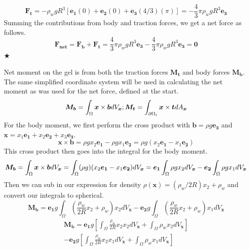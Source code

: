 \documentclass[preprint,12pt,authoryear]{elsarticle}
\begin{document}
\begin{equation}
    \bm{F_t} = -\rho_w g R^3 \left[ \bm{e_1} (0) + \bm{e_2} (0) + \bm{e_3} (4/3)(\pi) \right] = -\frac{4}{3}\pi\rho_w g R^3 \bm{e_3}
\end{equation}
Summing the contributions from body and traction forces, we get a net force as follows.
\begin{equation}
    \bm{F_{net}} = \bm{F_{b}} + \bm{F_{t}} = \frac{4}{3}\pi\rho_w g R^3 \bm{e_3} -\frac{4}{3}\pi\rho_w g R^3 \bm{e_3} = \bm{0}
\end{equation}
\hspace*{\fill} $\bigstar$

Net moment on the gel is from both the traction forces $\bm{M_t}$ and body forces $\bm{M_b}$. The same simplified coordinate system will be used in calculating the net moment as was used for the net force, defined at the start.
\begin{equation}
    \bm{M_b} = \int_{\Omega}\bm{x} \times \bm{b} \space dV_{\bm{x}} \space ; \space \bm{M_t} = \int_{\partial \Omega_t} \bm{x} \times \bm{t} \space dA_{\bm{x}}
\end{equation}
For the body moment, we first perform the cross product with $\bm{b} = \rho g \bm{e_3}$ and $\bm{x} = x_1 \bm{e_1} + x_2 \bm{e_2} + x_3 \bm{e_3}$.
\begin{equation}
    \bm{x} \times \bm{b} = \rho g x_2 \bm{e_1} - \rho g x_1 \bm{e_2} = \rho g (x_2\bm{e_1} - x_1 \bm{e_2})
\end{equation}
This cross product then goes into the integral for the body moment.
\begin{equation}
    \bm{M_b} = \int_{\Omega}\bm{x} \times \bm{b} \space dV_{\bm{x}} = \int_{\Omega} (\rho g)(x_2\bm{e_1} - x_1 \bm{e_2}) dV_{\bm{x}} = \bm{e_1}\int_{\Omega} \rho gx_2dV_{\bm{x}} - \bm{e_2}\int_{\Omega} \rho gx_1 dV_{\bm{x}}
\end{equation}
Then we can sub in our expression for density $\rho(\bm{x}) = (\rho_w/2 R)x_2 + \rho_w$ and convert our integrals to spherical.
\begin{equation}
    \bm{M_b} = \bm{e_1}g \int_{\Omega} (\frac{\rho_w}{2R}x_2 + \rho_w) x_2dV_{\bm{x}} - \bm{e_2}g\int_{\Omega} (\frac{\rho_w}{2R}x_2 + \rho_w)x_1 dV_{\bm{x}}
\end{equation}
\begin{equation}
\begin{split}
    \bm{M_b} = \bm{e_1}g \left[ \int_{\Omega} \frac{\rho_w}{2R}x_2x_2dV_{\bm{x}} + \int_{\Omega}\rho_w x_2dV_{\bm{x}} \right] \\
    - \bm{e_2}g \left[ \int_{\Omega} \frac{\rho_w}{2R}x_2x_1 dV_{\bm{x}} + \int_{\Omega}\rho_w x_1dV_{\bm{x}}\right]
\end{split}
\end{equation}
\end{document}
